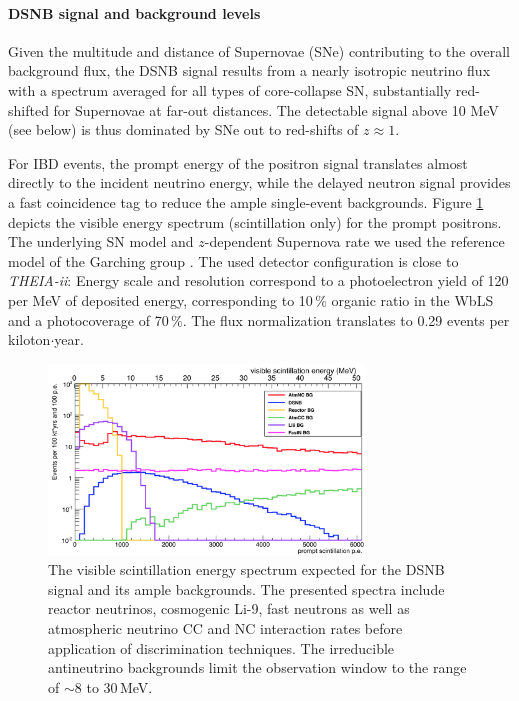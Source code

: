 
\paragraph{DSNB signal and background levels}
Given the multitude and distance of Supernovae (SNe) contributing to the overall background flux, the DSNB signal results from a nearly isotropic neutrino flux with a  spectrum averaged for all types of core-collapse SN, substantially red-shifted for Supernovae at far-out distances. The detectable signal above 10 MeV (see below) is thus dominated by SNe out to red-shifts of $z\approx1$. 

For IBD events, the prompt energy of the positron signal translates almost directly to the incident neutrino energy, while the delayed neutron signal provides a fast coincidence tag to reduce the ample single-event backgrounds. Figure \ref{fig:dsnb_spectrum} depicts the visible energy spectrum (scintillation only) for the prompt positrons. The underlying SN model and $z$-dependent Supernova rate we used the reference model of the Garching group \cite{}. The used detector configuration is close to {\it THEIA-ii}: Energy scale and resolution correspond to a photoelectron yield of 120 per MeV of deposited energy, corresponding to 10\,\% organic ratio in the WbLS and a photocoverage of 70\,\%. The flux normalization translates to 0.29 events per kiloton$\cdot$year.

\begin{figure}[htp!]
\centering
\includegraphics[width=0.75\textwidth]{dsnb/dsnb_spectrum}
\caption{The visible scintillation energy spectrum expected for the DSNB signal and its ample backgrounds. The presented spectra include reactor neutrinos, cosmogenic Li-9, fast neutrons as well as atmospheric neutrino CC and NC interaction rates before application of discrimination techniques. The irreducible antineutrino backgrounds limit the observation window to the range of $\sim$8 to 30\,MeV.}
\label{fig:dsnb_spectrum}
\end{figure}

